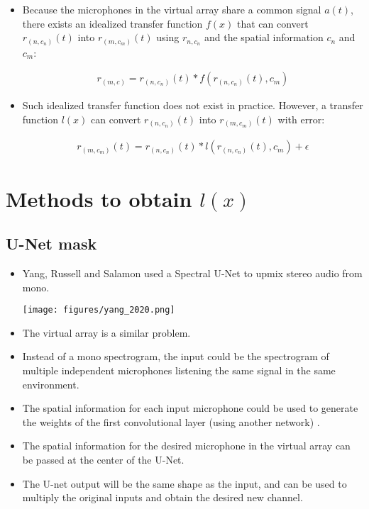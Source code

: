 \documentclass[14pt]{extarticle}
\begin{document}
\begin{itemize}

\item Because the microphones in the virtual array share a common signal $a(t)$, there exists an idealized transfer function $f(x)$ that can convert $r_{(n,c_n)}(t)$ into $r_{(m,c_m)}(t)$ using $r_{n,c_n}$ and the spatial information $c_n$ and $c_m$:

\begin{align*}
r_{(m,c)}= r_{(n,c_n)}(t) \ast f(r_{(n,c_n)}(t),c_m)
\end{align*}

\item Such idealized transfer function does not exist in practice. However, a transfer function $l(x)$ can convert $r_{(n,c_n)}(t)$ into $r_{(m,c_m)}(t)$ with error:

\begin{align*}
r_{(m,c_m)}(t) = r_{(n,c_n)}(t) \ast l(r_{(n,c_n)}(t),c_m) + \epsilon
\end{align*}

\end{itemize}

\section{Methods to obtain $l(x)$}

\subsection{U-Net mask}

\begin{itemize}
		
\item Yang, Russell and Salamon \cite{yang2020telling} used a Spectral U-Net \cite{gao20192, stoller2018wave} to upmix stereo audio from mono. 

\begin{center}
\texttt{[image: figures/yang\_2020.png]}
\end{center}

\item The virtual array is a similar problem.

\item Instead of a mono spectrogram, the input could be the spectrogram of multiple independent microphones listening the same signal in the same environment. 

\item The spatial information for each input microphone could be used to generate the weights of the first convolutional layer (using another network) \cite{simonovsky2017dynamic, xiong2015conditional}.

\item The spatial information for the desired microphone in the virtual array can be passed at the center of the U-Net.

\item The U-net output will be the same shape as the input, and can be used to multiply the original inputs and obtain the desired new channel. 

\end{itemize}
\end{document}
